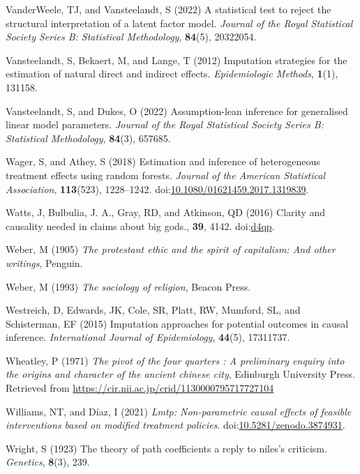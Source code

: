 \documentclass[
  singlecolumn,
  9pt]{article}
\begin{document}
\begin{CSLReferences}
VanderWeele, TJ, and Vansteelandt, S (2022) A statistical test to reject
the structural interpretation of a latent factor model. \emph{Journal of
the Royal Statistical Society Series B: Statistical Methodology},
\textbf{84}(5), 20322054.

Vansteelandt, S, Bekaert, M, and Lange, T (2012) Imputation strategies
for the estimation of natural direct and indirect effects.
\emph{Epidemiologic Methods}, \textbf{1}(1), 131158.

Vansteelandt, S, and Dukes, O (2022) Assumption-lean inference for
generalised linear model parameters. \emph{Journal of the Royal
Statistical Society Series B: Statistical Methodology}, \textbf{84}(3),
657685.

Wager, S, and Athey, S (2018) Estimation and inference of heterogeneous
treatment effects using random forests. \emph{Journal of the American
Statistical Association}, \textbf{113}(523), 1228--1242.
doi:\href{https://doi.org/10.1080/01621459.2017.1319839}{10.1080/01621459.2017.1319839}.

Watts, J, Bulbulia, J. A., Gray, RD, and Atkinson, QD (2016) Clarity and
causality needed in claims about big gods., \textbf{39}, 4142.
doi:\href{https://doi.org/d4qp}{d4qp}.

Weber, M (1905) \emph{The protestant ethic and the spirit of capitalism:
And other writings}, Penguin.

Weber, M (1993) \emph{The sociology of religion}, Beacon Press.

Westreich, D, Edwards, JK, Cole, SR, Platt, RW, Mumford, SL, and
Schisterman, EF (2015) Imputation approaches for potential outcomes in
causal inference. \emph{International Journal of Epidemiology},
\textbf{44}(5), 17311737.

Wheatley, P (1971) \emph{The pivot of the four quarters : A preliminary
enquiry into the origins and character of the ancient chinese city},
Edinburgh University Press. Retrieved from
\url{https://cir.nii.ac.jp/crid/1130000795717727104}

Williams, NT, and Díaz, I (2021) \emph{Lmtp: Non-parametric causal
effects of feasible interventions based on modified treatment policies}.
doi:\href{https://doi.org/10.5281/zenodo.3874931}{10.5281/zenodo.3874931}.

Wright, S (1923) The theory of path coefficients a reply to niles's
criticism. \emph{Genetics}, \textbf{8}(3), 239.

\end{CSLReferences}
\end{document}
